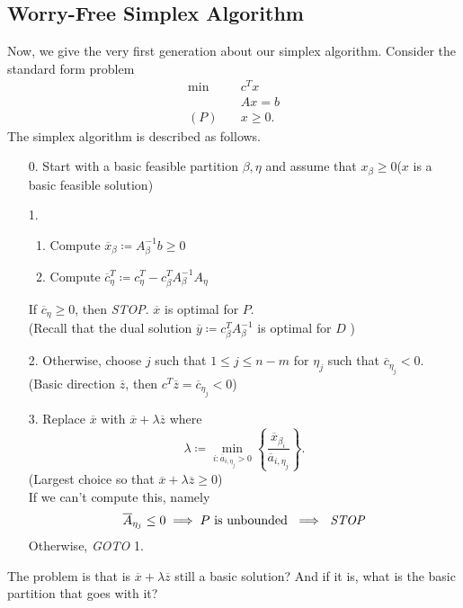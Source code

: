 \subsection{Worry-Free Simplex Algorithm}
Now, we give the very first generation about our simplex algorithm. Consider the standard form problem
\[
	\begin{alignedat}{5}
		\min~&c^{T}x\\
		&Ax = b \\
		(P)\quad&x\geq  0.
	\end{alignedat}
\]
The simplex algorithm is described as follows.
\begin{enumerate}
	\item[0.] Start with a basic feasible partition \(\beta, \eta\) and assume that \(x_{\beta}\geq 0\)(\(x\) is a basic feasible solution)
	\item[1.] \begin{enumerate}
			\item Compute \(\overline{x}_{\beta} \coloneqq A^{-1}_{\beta} b \geq 0\)
			\item Compute \(\overline{c}_{\eta}^{T} \coloneqq c_{\eta}^{T} - c_{\beta}^{T} A^{-1}_{\beta} A_{\eta}\)
		\end{enumerate}
		If \(\overline{c}_{\eta} \geq 0\), then \emph{STOP}. \(\overline{x}\) is optimal for \(P\). \\(Recall that the dual solution \(\overline{y}\coloneqq c_{\beta}^{T}A^{-1}_{\beta}\) is optimal for \(D\) )
	\item[2.] Otherwise, choose \(j\) such that \(1\leq j\leq n-m\) for \(\eta_j\) such that \(\overline{c}_{\eta_j} < 0\). (Basic direction \(\overline{z}\), then \(c^{T}\overline{z} = \overline{c}_{\eta_{j}}<0\))
	\item[3.] Replace \(\overline{x}\) with \(\overline{x} + \lambda \overline{z}\) where
		\[
			\lambda \coloneqq \min_{i:\overline{a}_{i, \eta_{j}}>0}\left\{ \frac{\overline{x}_{\beta_{i}}}{\overline{a}_{i, \eta_{j}}} \right\}.
		\]
		(Largest choice so that \(\overline{x} + \lambda \overline{z} \geq 0\))\\
		If we can't compute this, namely
		\[
			\overline{A}_{\eta_{j}} \leq 0\implies P \text{ is unbounded }\implies \text{ \emph{STOP}}
		\]
		Otherwise, \emph{GOTO} 1.
\end{enumerate}

\begin{problem}
The problem is that is \(\overline{x}+\lambda \overline{z}\) still a basic solution? And if it is, what is the basic partition that goes with it?
\end{problem}

